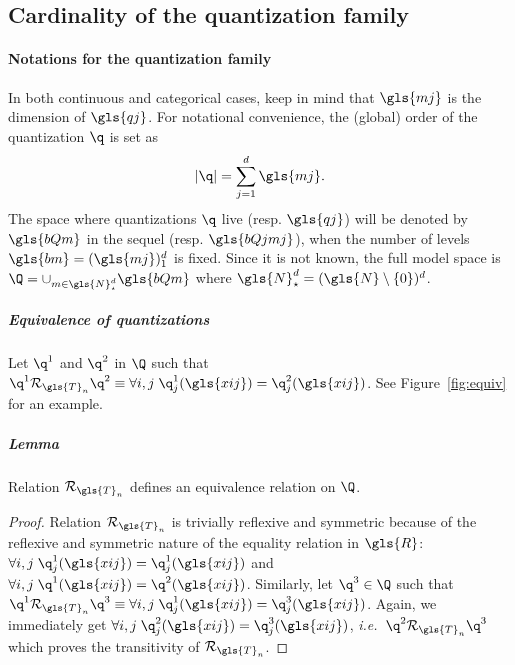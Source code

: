 \subsection{Cardinality of the quantization family} \label{subsec:cardinality_quant}

\paragraph{Notations for the quantization family}

In both continuous and categorical cases, keep in mind that $\gls{mj}$ is the dimension of $\gls{qj}$. For notational convenience, the (global) order of the quantization $\q$ is set as 
\[|\q|=\sum_{j=1}^d \gls{mj}.\]
The space where quantizations $\q$ live (resp. $\gls{qj}$) will be denoted by $\gls{bQm}$ in the sequel (resp. $\gls{bQjmj}$), when the number of levels $\gls{bm} = (\gls{mj})_1^d$ is fixed. Since it is not known, the full model space is $\Q = \cup_{m \in \gls{N}_\star^{d}} \gls{bQm}$ where $\gls{N}_\star^{d} = (\gls{N} \setminus \{0\})^d$.

\subparagraph{Equivalence of quantizations} \label{par:equiv}

Let $\q^1$ and $\q^2$ in $\Q$ such that $\q^1 \mathcal{R}_{\gls{T}_n} \q^2 \equiv \forall i,j \; \q^1_j(\gls{xij}) = \q^2_j(\gls{xij})$. See Figure~\ref{fig:equiv} for an example.

\subparagraph{Lemma} Relation $\mathcal{R}_{\gls{T}_n}$ defines an equivalence relation on $\Q$.

\begin{proof}
Relation $\mathcal{R}_{\gls{T}_n}$ is trivially reflexive and symmetric because of the reflexive and symmetric nature of the equality relation in $\gls{R}$: $\forall i,j \; \q^1_j(\gls{xij}) = \q^1_j(\gls{xij})$ and $\forall i,j \; \q^1(\gls{xij}) = \q^2(\gls{xij})$. Similarly, let $\q^3 \in \Q$ such that $\q^1 \mathcal{R}_{\gls{T}_n} \q^3  \equiv \forall i,j \; \q^1_j(\gls{xij}) = \q^3_j(\gls{xij})$. Again, we immediately get $\forall i,j \; \q^2_j(\gls{xij}) = \q^3_j(\gls{xij})$, \textit{i.e.}\ $\q^2 \mathcal{R}_{\gls{T}_n} \q^3$ which proves the transitivity of $\mathcal{R}_{\gls{T}_n}$.
\end{proof}

